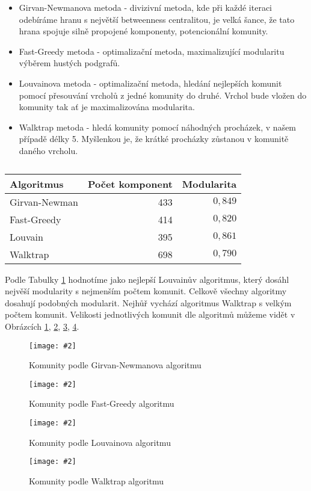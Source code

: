 \documentclass[a4paper,12pt]{article}
\newcommand{\image}[4]{\begin{figure}[h!] \centering \texttt{[image: \#2]} \caption{#4} \label{#3} \end{figure}}
\begin{document}
\begin{itemize}
    \item Girvan-Newmanova metoda - divizivní metoda, kde při každé iteraci odebíráme hranu s největší betweenness centralitou, je velká šance, že tato hrana spojuje silně propojené komponenty, potencionální komunity.
    \item Fast-Greedy metoda - optimalizační metoda, maximalizující modularitu výběrem hustých podgrafů.
    \item Louvainova metoda - optimalizační metoda, hledání nejlepších komunit pomocí přesouvání vrcholů z jedné komunity do druhé. Vrchol bude vložen do komunity tak ať je maximalizována modularita.
    \item Walktrap metoda - hledá komunity pomocí náhodných procházek, v našem případě délky 5. Myšlenkou je, že krátké procházky zůstanou v komunitě daného vrcholu.
\end{itemize}

\begin{table}[h!]
    \centering
    \begin{tabular}{l | r | r}
        Algoritmus      & Počet komponent   & Modularita    \\\hline\hline
        Girvan-Newman   & 433               & $0,849$       \\
        Fast-Greedy     & 414               & $0,820$       \\
        Louvain         & 395               & $0,861$       \\
        Walktrap        & 698               & $0,790$       \\
    \end{tabular}
    \caption{}
    \label{tab:community}
\end{table}

Podle Tabulky \ref{tab:community} hodnotíme jako nejlepší Louvainův algoritmus, který dosáhl nejvěší modularity s nejmenším počtem komunit. Celkově všechny
algoritmy dosahují podobných modularit. Nejhůř vychází algoritmus Walktrap s velkým počtem komunit. Velikosti jednotlivých komunit dle algoritmů můžeme vidět
v Obrázcích \ref{fig:gnc}, \ref{fig:fgc}, \ref{fig:lc}, \ref{fig:wtc}.

\image{1}{../grafy/girvanNewmanCommunitySize.pdf}{fig:gnc}{Komunity podle Girvan-Newmanova algoritmu}
\image{1}{../grafy/fastGreedyCommunitySize.pdf}{fig:fgc}{Komunity podle Fast-Greedy algoritmu}
\image{1}{../grafy/louvainCommunitySize.pdf}{fig:lc}{Komunity podle Louvainova algoritmu}
\image{1}{../grafy/walkTrapCommunitySize.pdf}{fig:wtc}{Komunity podle Walktrap algoritmu}
\end{document}
